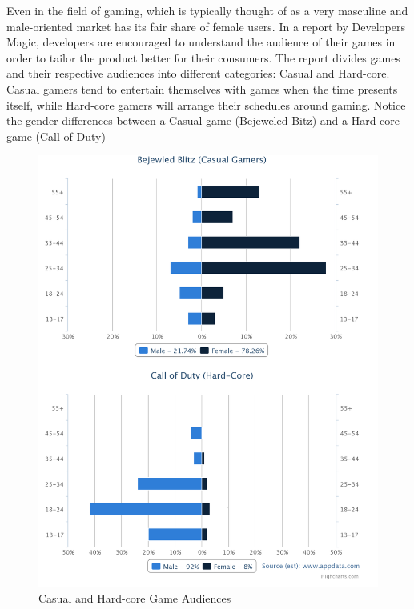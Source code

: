 \documentclass[12pt]{article}
\begin{document}
	Even in the field of gaming, which is typically thought of as a very masculine and male-oriented market has its fair share of female users. In a report by Developers Magic, developers are encouraged to understand the audience of their games in order to tailor the product better for their consumers. The report divides games and their respective audiences into different categories: Casual and Hard-core. Casual gamers tend to entertain themselves with games when the time presents itself, while Hard-core gamers will arrange their schedules around gaming\cite{gamestats}. Notice the gender differences between a Casual game (Bejeweled Bitz) and a Hard-core game (Call of Duty)
	\\
			\begin{figure}[H]
				\begin{center}
					\includegraphics[width=\textwidth,keepaspectratio]{StatsGaming}
					\caption{Casual and Hard-core Game Audiences}		
				\end{center}
			\end{figure}
			
\end{document}

